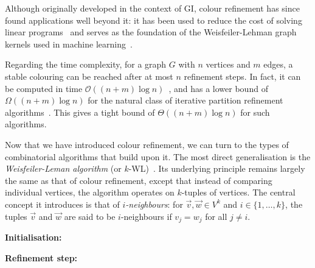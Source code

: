 Although originally developed in the context of GI, colour refinement has since found applications well beyond it: it has been used to reduce the cost of solving linear programs~\cite{grohe2014dimension} and serves as the foundation of the Weisfeiler-Lehman graph kernels used in machine learning~\cite{shervashidze2011weisfeiler}.



Regarding the time complexity, for a graph $G$ with $n$ vertices and $m$ edges, a stable colouring can be reached after at most $n$ refinement steps. In fact, it can be computed in time $\mathcal{O}((n + m)\log n)$~\cite{cardon1982partitioning}, and has a lower bound of $\Omega((n + m)\log n)$ for the natural class of iterative partition refinement algorithms~\cite{berkholz2017tight}. This gives a tight bound of $\Theta((n + m)\log n)$ for such algorithms.

Now that we have introduced colour refinement, we can turn to the types of combinatorial algorithms that build upon it. The most direct generalisation is the \textit{Weisfeiler-Leman algorithm} (or $k$-WL)~\cite{kiefer2020power}. Its underlying principle remains largely the same as that of colour refinement, except that instead of comparing individual vertices, the algorithm operates on $k$-tuples of vertices. The central concept it introduces is that of \textit{$i$-neighbours}: for $\vec{v}, \vec{w} \in V^k$ and $i \in \{1, \dots, k\}$, the tuples $\vec{v}$ and $\vec{w}$ are said to be $i$-neighbours if $v_j = w_j$ for all $j \neq i$. 

\begin{algorithm}
\caption{$k$-dimensional Weisfeiler-Leman ($k$-WL) algorithm}
\begin{algorithmic}[1]

\State\textbf{Initialisation:}
     
    \EndIf{}
\EndFor{}

\Repeat{}
    \State\textbf{Refinement step:}
            \EndIf{}
        \EndFor{}
    \EndFor{}

\end{algorithmic}
\end{algorithm}

